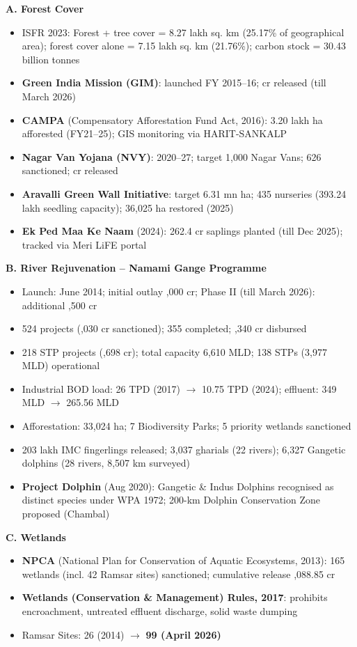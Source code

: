 \textbf{A. Forest Cover}
\begin{itemize}
  \item ISFR 2023: Forest + tree cover = 8.27 lakh sq. km (25.17\% of geographical area); forest cover alone = 7.15 lakh sq. km (21.76\%); carbon stock = 30.43 billion tonnes
  \item \textbf{Green India Mission (GIM)}: launched FY 2015--16;  cr released (till March 2026)
  \item \textbf{CAMPA} (Compensatory Afforestation Fund Act, 2016): 3.20 lakh ha afforested (FY21--25); GIS monitoring via HARIT-SANKALP
  \item \textbf{Nagar Van Yojana (NVY)}: 2020--27; target 1,000 Nagar Vans; 626 sanctioned;  cr released
  \item \textbf{Aravalli Green Wall Initiative}: target 6.31 mn ha; 435 nurseries (393.24 lakh seedling capacity); 36,025 ha restored (2025)
  \item \textbf{Ek Ped Maa Ke Naam} (2024): 262.4 cr saplings planted (till Dec 2025); tracked via Meri LiFE portal
\end{itemize}

\textbf{B. River Rejuvenation -- Namami Gange Programme}
\begin{itemize}
  \item Launch: June 2014; initial outlay ,000 cr; Phase II (till March 2026): additional ,500 cr
  \item 524 projects (,030 cr sanctioned); 355 completed; ,340 cr disbursed
  \item 218 STP projects (,698 cr); total capacity 6,610 MLD; 138 STPs (3,977 MLD) operational
  \item Industrial BOD load: 26 TPD (2017) $\to$ 10.75 TPD (2024); effluent: 349 MLD $\to$ 265.56 MLD
  \item Afforestation: 33,024 ha; 7 Biodiversity Parks; 5 priority wetlands sanctioned
  \item 203 lakh IMC fingerlings released; 3,037 gharials (22 rivers); 6,327 Gangetic dolphins (28 rivers, 8,507 km surveyed)
  \item \textbf{Project Dolphin} (Aug 2020): Gangetic \& Indus Dolphins recognised as distinct species under WPA 1972; 200-km Dolphin Conservation Zone proposed (Chambal)
\end{itemize}

\textbf{C. Wetlands}
\begin{itemize}
  \item \textbf{NPCA} (National Plan for Conservation of Aquatic Ecosystems, 2013): 165 wetlands (incl. 42 Ramsar sites) sanctioned; cumulative release ,088.85 cr
  \item \textbf{Wetlands (Conservation \& Management) Rules, 2017}: prohibits encroachment, untreated effluent discharge, solid waste dumping
  \item Ramsar Sites: 26 (2014) $\to$ \textbf{99 (April 2026)}
\end{itemize}

